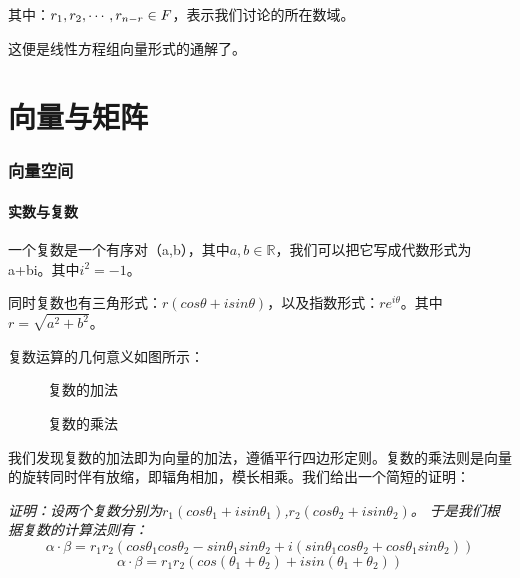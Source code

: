 \documentclass[a4paper]{ctexart}
\begin{document}
其中：$r_{1},r_{2},\cdots,r_{n-r} \in \mit{F}$，表示我们讨论的所在数域。

这便是线性方程组向量形式的通解了。

\part{向量与矩阵}
\section{向量空间}
\subsection{实数与复数}
一个复数是一个有序对（a,b），其中$a,b\in\mathbb{R}$，我们可以把它写成代数形式为a+bi。其中$i^2=-1$。

同时复数也有三角形式：$r(cos\theta+isin\theta)$，以及指数形式：$re^{i\theta}$。其中$r=\sqrt{a^2+b^2}$。

复数运算的几何意义如图所示：
\begin{figure}[htp]
\centering
{}
\caption{复数的加法}
\end{figure}

\begin{figure}[htp]
\centering
{}
\caption{复数的乘法}
\end{figure}

我们发现复数的加法即为向量的加法，遵循平行四边形定则。复数的乘法则是向量的旋转同时伴有放缩，即辐角相加，模长相乘。我们给出一个简短的证明：

\textit{
证明：设两个复数分别为$r_1(cos\theta_1+isin\theta_1)$,$r_2(cos\theta_2+isin\theta_2)$。
于是我们根据复数的计算法则有：}
$$
\alpha \cdot \beta = r_1 r_2 (cos\theta_1 cos\theta_2 -sin\theta_1 sin\theta_2 +i(sin\theta_1 cos\theta_2 +cos\theta_1 sin\theta_2))
$$
$$
\alpha \cdot \beta = r_1 r_2(cos(\theta_1+\theta_2)+isin(\theta_1+\theta_2))
$$
\end{document}
